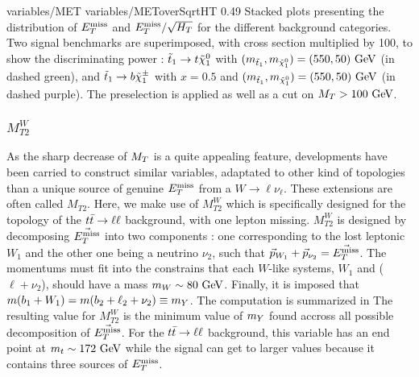                          {variables/MET}
                         {variables/METoverSqrtHT}
                         {0.49}
                         {Stacked plots presenting the distribution of $E_T^\text{miss}$ and $E_T^\text{miss} /
                         \sqrt{H_T}$ for the different background categories. Two
                         signal benchmarks are superimposed, with cross section multiplied
                         by 100, to show the discriminating power :
                         $\tilde{t}_1 \rightarrow t \tilde{\chi}_1^0$ with $(m_{\tilde{t}_1},m_{\tilde{\chi}_1^0})
                         = (550,50)~\text{GeV}$ (in dashed green), and $\tilde{t}_1 \rightarrow b \tilde{\chi}_1^\pm$
                         with $x = 0.5$ and $(m_{\tilde{t}_1}, m_{\tilde{\chi}_1^0}) = (550,50)~\text{GeV}$
                         (in dashed purple). The preselection is applied as well as a cut
                         on $M_T > 100 ~\text{GeV}$.}

        \subsubsection{$M_{T2}^{W}$}

        As the sharp decrease of $M_T$ is a quite appealing feature, developments have been
        carried \cite{MT2variables} to construct similar variables, adaptated to other kind
        of topologies than
        a unique source of genuine $E_T^\text{miss}$ from a $W \rightarrow \ell \nu_\ell$.  These extensions are
        often called $M_{T2}$. Here, we make use of $M_{T2}^W$ which is specifically
        designed for the topology of the $t\bar{t} \rightarrow \ell \ell$ background, with
        one lepton missing. $M_{T2}^W$ is designed by decomposing $\vec{E_T^\text{miss}}$ into two
        components : one corresponding to the lost leptonic $W_1$ and the other one being
        a neutrino $\nu_2$, such that $\vec{p}_{W_1} + \vec{p}_{\nu_2} = \vec{E_T^\text{miss}}$.
        The momentums must fit into the constrains that each $W$-like systems, $W_1$ and
        ($\ell + \nu_2$), should have a mass $m_W \sim 80 ~\text{GeV}$. Finally, it is imposed that
        $m(b_1 + W_1) = m(b_2 + \ell_2 + \nu_2) \equiv m_{Y}$. The computation is
        summarized in 
        The resulting value for $M_{T2}^W$ is the minimum value of $m_{Y}$ found accross
        all possible decomposition of $\vec{E_T^\text{miss}}$. For the $t\bar{t} \rightarrow \ell \ell$ background,
        this variable has an end point at $m_t \sim 172~\text{GeV}$ while the signal can get to
        larger values because it contains three sources of $E_T^\text{miss}$.

